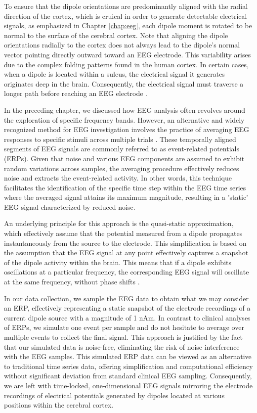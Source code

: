 \documentclass[a4paper, UKenglish, 11pt]{uiomaster}
\begin{document}
To ensure that the dipole orientations are predominantly aligned with the radial direction of the cortex, which is cruical in order to generate detectable electrical signals, as emphasized in Chapter \ref{chap:eeg}, each dipole moment is rotated to be normal to the surface of the cerebral cortex. Note that aligning the dipole orientations radially to the cortex does not always lead to the dipole's normal vector pointing directly outward toward an EEG electrode. This variability arises due to the complex folding patterns found in the human cortex. In certain cases, when a dipole is located within a sulcus, the electrical signal it generates originates deep in the brain. Consequently, the electrical signal must traverse a longer path before reaching an EEG electrode \cite{naess2021biophysically}.

In the preceding chapter, we discussed how EEG analysis often revolves around the exploration of specific frequency bands. However, an alternative and widely recognized method for EEG investigation involves the practice of averaging EEG responses to specific stimuli across multiple trials \cite{kropotov2016functional}. These temporally aligned segments of EEG signals are commonly referred to as event-related potentials (ERPs). Given that noise and various EEG components are assumed to exhibit random variations across samples, the averaging procedure effectively reduces noise and extracts the event-related activity. In other words, this technique facilitates the identification of the specific time step within the EEG time series where the averaged signal attains its maximum magnitude, resulting in a 'static' EEG signal characterized by reduced noise.

An underlying principle for this approach is the quasi-static approximation, which effectively assume that the potential measured from a dipole propagates instantaneously from the source to the electrode. This simplification is based on the assumption that the EEG signal at any point effectively captures a snapshot of the dipole activity within the brain. This means that if a dipole exhibits oscillations at a particular frequency, the corresponding EEG signal will oscillate at the same frequency, without phase shifts \cite{Ness2022}.

In our data collection, we sample the EEG data to obtain what we may consider an ERP, effectively representing a static snapshot of the electrode recordings of a current dipole source with a magnitude of 1 nAm. In contrast to clinical analyses of ERPs, we simulate one event per sample and do not hesitate to average over multiple events to collect the final signal. This approach is justified by the fact that our simulated data is noise-free, eliminating the risk of noise interference with the EEG samples. This simulated ERP data can be viewed as an alternative to traditional time series data, offering simplification and computational efficiency without significant deviation from standard clinical EEG sampling. Consequently, we are left with time-locked, one-dimensional EEG signals mirroring the electrode recordings of electrical potentials generated by dipoles located at various positions within the cerebral cortex.
\end{document}
